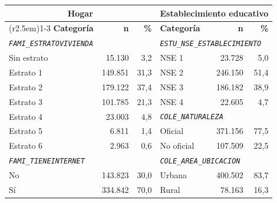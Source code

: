 \begingroup\tiny{}
\par
\noindent\begin{minipage}{\textwidth}
\centering
{}\label{tab:frec-clave}
\begin{tabular}{l r r @{\hspace{2.5em}} l r r}
  \toprule
  \multicolumn{3}{c}{\textbf{Hogar}} & \multicolumn{3}{c}{\textbf{Establecimiento educativo}} \\
  \cmidrule(r{2.5em}){1-3}\cmidrule{4-6}
  \textbf{Categoría} & \textbf{n} & \textbf{\%} & \textbf{Categoría} & \textbf{n} & \textbf{\%} \\
  \midrule
  \multicolumn{3}{l}{\textit{\texttt{FAMI\_ESTRATOVIVIENDA}}} & \multicolumn{3}{l}{\textit{\texttt{ESTU\_NSE\_ESTABLECIMIENTO}}} \\
  Sin estrato & 15.130 & 3,2 & NSE 1 & 23.728 & 5,0 \\
  Estrato 1 & 149.851 & 31,3 & NSE 2 & 246.150 & 51,4 \\
  Estrato 2 & 179.122 & 37,4 & NSE 3 & 186.182 & 38,9 \\
  Estrato 3 & 101.785 & 21,3 & NSE 4 & 22.605 & 4,7 \\
  Estrato 4 & 23.003 & 4,8 & \multicolumn{3}{l}{\textit{\texttt{COLE\_NATURALEZA}}} \\
  Estrato 5 & 6.811 & 1,4 & Oficial & 371.156 & 77,5 \\
  Estrato 6 & 2.963 & 0,6 & No oficial & 107.509 & 22,5 \\
  \multicolumn{3}{l}{\textit{\texttt{FAMI\_TIENEINTERNET}}} & \multicolumn{3}{l}{\textit{\texttt{COLE\_AREA\_UBICACION}}} \\
  No & 143.823 & 30,0 & Urbana & 400.502 & 83,7 \\
  Sí & 334.842 & 70,0 & Rural & 78.163 & 16,3 \\
  \bottomrule
\end{tabular}
\end{minipage}
\par
\endgroup
